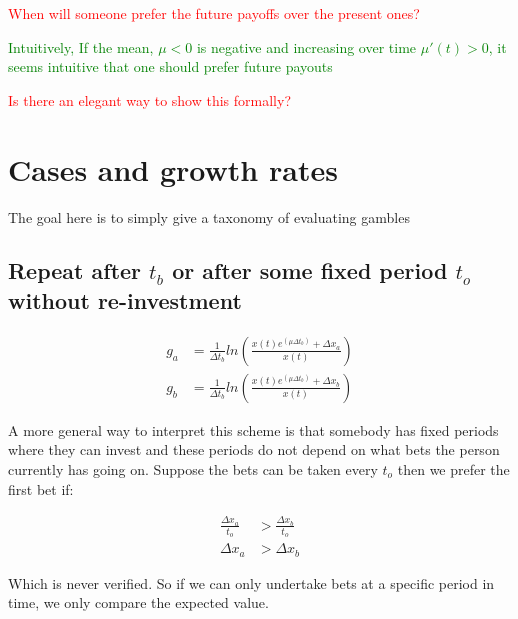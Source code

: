 \documentclass{article}
\date{October 2018}
\begin{document}
\textcolor{red}{When will someone prefer the future payoffs over the present ones? }

\textcolor{green}{Intuitively, If the mean, $\mu<0$ is negative and increasing over time $\mu'(t)>0$, it seems intuitive that one should prefer future payouts }

\textcolor{red}{Is there an elegant way to show this formally? }



\section{Cases and growth rates}

The goal here is to simply give a taxonomy of evaluating gambles

\subsection{Repeat after $t_b$ or after some fixed period $t_o$ without re-investment }

\begin{align*}
g_a&=\frac{1}{\Delta t_b} ln 
\left( 
\frac{x(t)e^{(\mu \Delta t_b)}+\Delta x_a }{x(t)}
\right) \\
g_b&=\frac{1}{\Delta t_b} ln 
\left( 
\frac{x(t)e^{(\mu \Delta t_b)}+\Delta x_b }{x(t)}
\right) 
\end{align*}

A more general way to interpret this scheme is that somebody has fixed periods where they can invest and these periods do not depend on what bets the person currently has going on. Suppose the bets can be taken every $t_o$ then we prefer the first bet if: 

\begin{align*}
\frac{\Delta x_a}{t_o}&>\frac{\Delta x_b}{t_o} \\
\Delta x_a&>\Delta x_b 
\end{align*}

Which is never verified. So if we can only undertake bets at a specific period in time, we only compare the expected value. 
\end{document}
